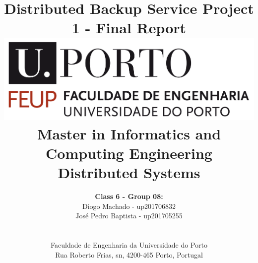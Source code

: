 \documentclass[a4paper]{article}
\begin{document}
\setlength{\textwidth}{16cm}
\setlength{\textheight}{22cm}


\title{\Huge\textbf{Distributed Backup Service}\linebreak\linebreak\linebreak
\Large\textbf{Project 1 - Final Report}\linebreak\linebreak
\linebreak\linebreak
\includegraphics[scale=0.1]{feup-logo.png}\linebreak\linebreak
\linebreak\linebreak
\Large{Master in Informatics and Computing Engineering} \linebreak\linebreak
\Large{Distributed Systems}\linebreak
}

\author{\textbf{Class 6 - Group 08:}\\ Diogo Machado - up201706832 \\ José Pedro Baptista - up201705255
\\\linebreak\linebreak \\
 \\ Faculdade de Engenharia da Universidade do Porto \\ Rua Roberto Frias, s\/n, 4200-465 Porto, Portugal
 \linebreak\linebreak\linebreak
\linebreak\linebreak\vspace{1cm}}
\maketitle
\thispagestyle{empty}
\end{document}
